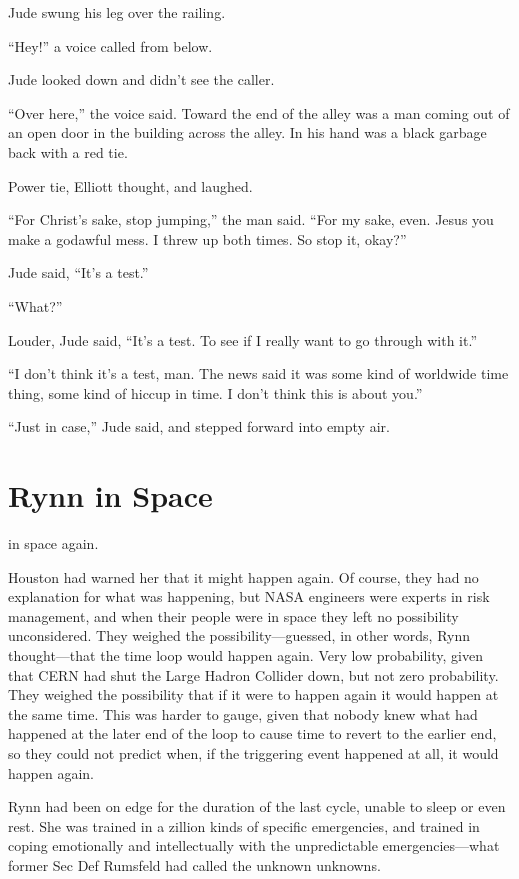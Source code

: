 Jude swung his leg over the railing.

“Hey!” a voice called from below.

Jude looked down and didn’t see the caller.

“Over here,” the voice said. Toward the end of the alley was a man coming out of an open door in the building across the alley. In his hand was a black garbage back with a red tie.

Power tie, Elliott thought, and laughed.

“For Christ’s sake, stop jumping,” the man said. “For my sake, even. Jesus you make a godawful mess. I threw up both times. So stop it, okay?”

Jude said, “It’s a test.”

“What?”

Louder, Jude said, “It’s a test. To see if I really want to go through with it.”

“I don’t think it’s a test, man. The news said it was some kind of worldwide time thing, some kind of hiccup in time. I don’t think this is about you.”

“Just in case,” Jude said, and stepped forward into empty air.



\chapter{Rynn in Space}

 in space again.

Houston had warned her that it might happen again. Of course, they had no explanation for what was happening, but NASA engineers were experts in risk management, and when their people were in space they left no possibility unconsidered. They weighed the possibility—guessed, in other words, Rynn thought—that the time loop would happen again. Very low probability, given that CERN had shut the Large Hadron Collider down, but not zero probability. They weighed the possibility that if it were to happen again it would happen at the same time. This was harder to gauge, given that nobody knew what had happened at the later end of the loop to cause time to revert to the earlier end, so they could not predict when, if the triggering event happened at all, it would happen again.

Rynn had been on edge for the duration of the last cycle, unable to sleep or even rest. She was trained in a zillion kinds of specific emergencies, and trained in coping emotionally and intellectually with the unpredictable emergencies—what former Sec Def Rumsfeld had called the unknown unknowns.

